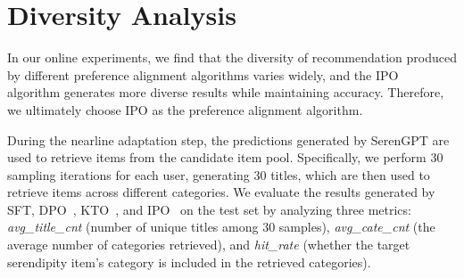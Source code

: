 \section{Diversity Analysis}\label{app:diversity} 
\begin{table}[ht]
\centering
\caption{Diversity comparison between different tuning strategies on serendipity recommendation. }
\label{tab:diversity}
\end{table}

In our online experiments, we find that the diversity of recommendation produced by different preference alignment algorithms varies widely, and the IPO~\cite{azar2024general} algorithm generates more diverse results while maintaining accuracy. Therefore, we ultimately choose IPO as the preference alignment algorithm.

During the nearline adaptation step, the predictions generated by SerenGPT are used to retrieve items from the candidate item pool. Specifically, we perform 30 sampling iterations for each user, generating 30 titles, which are then used to retrieve items across different categories. We evaluate the results generated by SFT, DPO~\cite{rafailov2024direct}, KTO~\cite{ethayarajh2024kto}, and IPO~\cite{azar2024general} on the test set by analyzing three metrics: \textit{avg\_title\_cnt} (number of unique titles among 30 samples), \textit{avg\_cate\_cnt} (the average number of categories retrieved), and \textit{hit\_rate} (whether the target serendipity item's category is included in the retrieved categories). 

